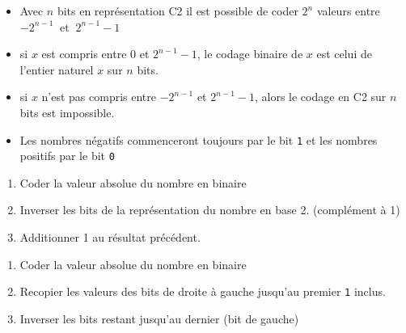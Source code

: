\begin{propriete}{}
	\begin{itemize}
		\item Avec $n$ bits en représentation C2 il est possible de coder $2^n$ valeurs entre  $-2^{n-1}\: \textrm{ et } \: 2^{n-1}-1$
		\item si $x$ est compris entre 0 et $2^{n-1}-1$, le codage binaire de $x$ est celui de l'entier naturel $x$ sur $n$ bits.
		\item si $x$ n'est pas compris entre $-2^{n-1}$ et $2^{n-1}-1$, alors le codage en C2 sur $n$ bits est impossible. 
		\item Les nombres négatifs commenceront toujours par le bit \verb|1| et les nombres positifs par le bit \verb|0| 

	\end{itemize}
	
\end{propriete}


\begin{propriete}{}
	\begin{enumerate}
		\item Coder la valeur absolue du nombre en binaire
	   \item Inverser les bits de la représentation du nombre en base 2. (complément à 1)
	   \item Additionner 1 au résultat précédent. 
	\end{enumerate}
\end{propriete}

\begin{exercice_cours}{}
\end{exercice_cours}


\begin{propriete}{}
 \begin{enumerate}
 	\item Coder la valeur absolue du nombre en binaire
	\item Recopier les valeurs des bits de droite à gauche jusqu'au premier \verb|1|   inclus.
	\item Inverser les bits restant jusqu'au dernier (bit de gauche)
 \end{enumerate}
\end{propriete}

\begin{exercice_cours}{}
\end{exercice_cours}

